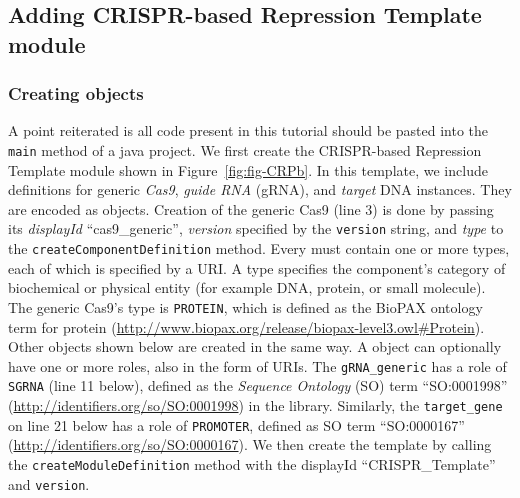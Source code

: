 \subsection*{Adding CRISPR-based Repression Template module}
\subsubsection*{Creating  objects}
A point reiterated is all code present in this tutorial should be pasted into the \lstinline+main+ method of a java project.
We first create the CRISPR-based Repression Template module shown in
Figure~\ref{fig:fig-CRPb}.  In this template, we include definitions
for generic \emph{Cas9}, \emph{guide RNA} (gRNA), and \emph{target}
DNA  instances. They are encoded as
 objects. Creation of the generic Cas9 (line
3)  is done by passing its \emph{displayId}
``cas9\_generic'', \emph{version} specified by the \lstinline+version+
string, and \emph{type} to the \lstinline+createComponentDefinition+
method. Every  must contain one or more
types, each of which is specified by a URI. A type specifies the
component's category of biochemical or physical entity (for example
DNA, protein, or small molecule). The generic Cas9's type is
\lstinline+PROTEIN+, which is defined as the BioPAX ontology term for
protein
(\url{http://www.biopax.org/release/biopax-level3.owl\#Protein}). Other
 objects shown below are created in the same
way. A  object can optionally have one or
more roles, also in the form of URIs. The \lstinline+gRNA_generic+ has
a role of \lstinline+SGRNA+ (line 11 below), defined as the
\emph{Sequence Ontology} (SO) term ``SO:0001998''
(\url{http://identifiers.org/so/SO:0001998}) in the
library. Similarly, the \lstinline+target_gene+ on line 21 below has a role of
\lstinline+PROMOTER+, defined as SO term ``SO:0000167''
(\url{http://identifiers.org/so/SO:0000167}). We then create the  template by calling the \lstinline+createModuleDefinition+ method with the displayId ``CRISPR\_Template'' and \lstinline+version+. 

